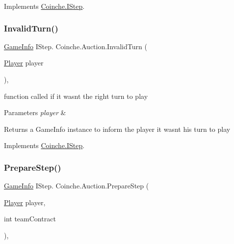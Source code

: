 Implements \hyperlink{interface_coinche_1_1_i_step_a1b410159a7988ae4e75154539715e7ba}{Coinche.\+I\+Step}.

\mbox{\label{class_coinche_1_1_auction_a00eba97a2289eb3bf7b2f4f7c84c8349}} 
\subsubsection{\texorpdfstring{Invalid\+Turn()}{InvalidTurn()}}
{\footnotesize\ttfamily \hyperlink{class_coinche_1_1_tools_1_1_game_info}{Game\+Info} I\+Step. Coinche.\+Auction.\+Invalid\+Turn (\begin{DoxyParamCaption}\item[{\hyperlink{class_coinche_1_1_player}{Player}}]{player }\end{DoxyParamCaption})\hspace{0.3cm}{\ttfamily [inline]}, {\ttfamily [private]}}



function called if it wasn\textquotesingle{}t the right turn to play 


\begin{DoxyParams}{Parameters}
{\em player} & \\
\hline
\end{DoxyParams}
\begin{DoxyReturn}{Returns}
a Game\+Info instance to inform the player it wasn\textquotesingle{}t his turn to play
\end{DoxyReturn}


Implements \hyperlink{interface_coinche_1_1_i_step_afc64813670860f5ee0829264751abc0a}{Coinche.\+I\+Step}.

\mbox{\label{class_coinche_1_1_auction_a9596ae8ce46f848244854d59c9bedadb}} 
\subsubsection{\texorpdfstring{Prepare\+Step()}{PrepareStep()}}
{\footnotesize\ttfamily \hyperlink{class_coinche_1_1_tools_1_1_game_info}{Game\+Info} I\+Step. Coinche.\+Auction.\+Prepare\+Step (\begin{DoxyParamCaption}\item[{\hyperlink{class_coinche_1_1_player}{Player}}]{player,  }\item[{int}]{team\+Contract }\end{DoxyParamCaption})\hspace{0.3cm}{\ttfamily [inline]}, {\ttfamily [private]}}



